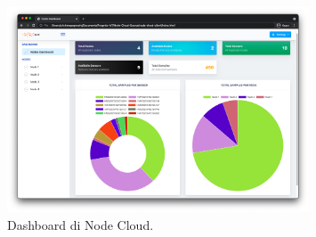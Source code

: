 \documentclass{article}
\begin{document}
\begin{figure}[H]
    \centering
    \includegraphics[width=0.80\textwidth]{dashboard.png}
    \caption{Dashboard di Node Cloud.}
    \label{fig:node-cloud-dashboard}
\end{figure}
\end{document}
